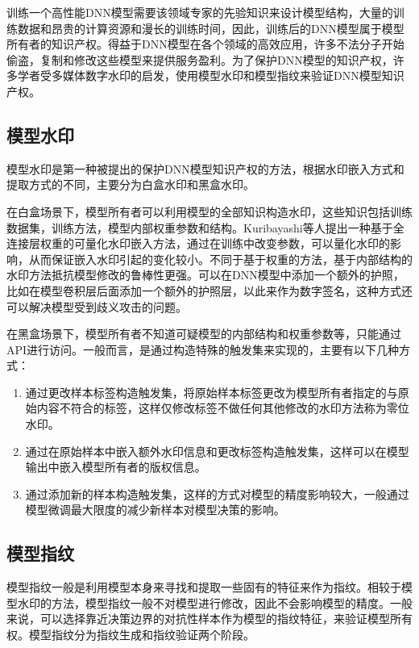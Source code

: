 训练一个高性能DNN模型需要该领域专家的先验知识来设计模型结构，大量的训练数据和昂贵的计算资源和漫长的训练时间，因此，训练后的DNN模型属于模型所有者的知识产权。得益于DNN模型在各个领域的高效应用，许多不法分子开始偷盗，复制和修改这些模型来提供服务盈利。为了保护DNN模型的知识产权\cite{JFYZ202205002,WXAQ202202001}，许多学者受多媒体数字水印的启发，使用模型水印和模型指纹来验证DNN模型知识产权。

\subsection{模型水印}

模型水印是第一种被提出的保护DNN模型知识产权的方法，根据水印嵌入方式和提取方式的不同，主要分为白盒水印和黑盒水印。

在白盒场景下，模型所有者可以利用模型的全部知识构造水印，这些知识包括训练数据集，训练方法，模型内部权重参数和结构。Kuribayashi等人\cite{kuribayashi2020deepwatermark}提出一种基于全连接层权重的可量化水印嵌入方法，通过在训练中改变参数，可以量化水印的影响，从而保证嵌入水印引起的变化较小。不同于基于权重的方法，基于内部结构的水印方法抵抗模型修改的鲁棒性更强。可以在DNN模型中添加一个额外的护照\cite{fan2019rethinking}，比如在模型卷积层后面添加一个额外的护照层，以此来作为数字签名，这种方式还可以解决模型受到歧义攻击的问题。

在黑盒场景下，模型所有者不知道可疑模型的内部结构和权重参数等，只能通过API进行访问。一般而言，是通过构造特殊的触发集来实现的，主要有以下几种方式：

\begin{enumerate}
	\renewcommand{\labelenumi}{\theenumi)}
	\item 通过更改样本标签构造触发集，将原始样本标签更改为模型所有者指定的与原始内容不符合的标签，这样仅修改标签不做任何其他修改的水印方法称为零位水印。
	\item 通过在原始样本中嵌入额外水印信息和更改标签构造触发集，这样可以在模型输出中嵌入模型所有者的版权信息。
	\item 通过添加新的样本构造触发集，这样的方式对模型的精度影响较大，一般通过模型微调最大限度的减少新样本对模型决策的影响。
\end{enumerate}


\subsection{模型指纹}

模型指纹一般是利用模型本身来寻找和提取一些固有的特征来作为指纹。相较于模型水印的方法，模型指纹一般不对模型进行修改，因此不会影响模型的精度。一般来说，可以选择靠近决策边界的对抗性样本作为模型的指纹特征，来验证模型所有权。模型指纹分为指纹生成和指纹验证两个阶段。

